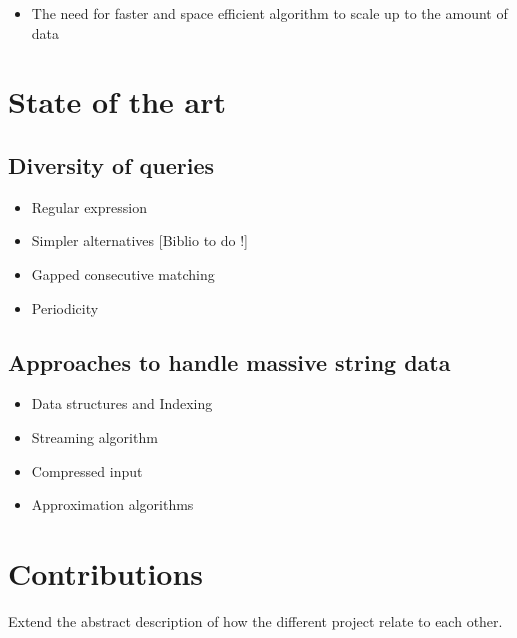 


\begin{itemize}
\item The need for faster and space efficient algorithm to scale up to the amount of data
\end{itemize}

\section{State of the art}

\subsection{Diversity of queries}
\begin{itemize}
\item Regular expression
\item Simpler alternatives [Biblio to do !]
\item Gapped consecutive matching
\item Periodicity
\end{itemize}

\subsection{Approaches to handle massive string data}

\begin{itemize}
\item Data structures and Indexing
\item Streaming algorithm
\item Compressed input
\item Approximation algorithms
\end{itemize}

\section{Contributions}

Extend the abstract description of how the different project relate to each other.
